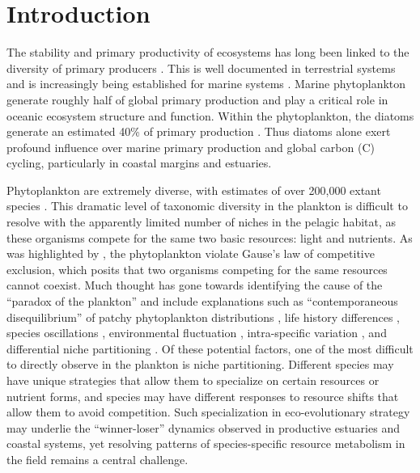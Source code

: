 \section{Introduction}
The stability and primary productivity of ecosystems has long been linked to the diversity of primary producers \citep{Elton1958, Cardinale2012}. This is well documented in terrestrial systems \citep{Naeem1994, Tilman2001, Cadotte2013, Balvanera2006, Tilman1996} and is increasingly being established for marine systems \citep{Behl2011, Striebel2009, Steiner2005, Ptacnik2008}. Marine phytoplankton generate roughly half of global primary production \citep{Nielsen1960, Strickland1965, Field1998} and play a critical role in oceanic ecosystem structure and function. Within the phytoplankton, the diatoms generate an estimated 40\% of primary production \citep{Nelson1995}. Thus diatoms alone exert profound influence over marine primary production and global carbon (C) cycling, particularly in coastal margins and estuaries. \par
Phytoplankton are extremely diverse, with estimates of over 200,000 extant species \citep{Sournia1991, Tett1995, Mann1996}. This dramatic level of taxonomic diversity in the plankton is difficult to resolve with the apparently limited number of niches in the pelagic habitat, as these organisms compete for the same two basic resources: light and nutrients. As was highlighted by \citet{Hutchinson1961}, the phytoplankton violate Gause's law of competitive exclusion, which posits that two organisms competing for the same resources cannot coexist. Much thought has gone towards identifying the cause of the ``paradox of the plankton'' and include explanations such as ``contemporaneous disequilibrium'' of patchy phytoplankton distributions \citep{Richerson1970}, life history differences \citep{Huisman2001}, species oscillations \citep{Huisman1999}, environmental fluctuation \citep{Roy2007}, intra-specific variation \citep{Menden-deuer2014}, and differential niche partitioning \citep{Connel1980}. Of these potential factors, one of the most difficult to directly observe in the plankton is niche partitioning. Different species may have unique strategies that allow them to specialize on certain resources or nutrient forms, and species may have different responses to resource shifts that allow them to avoid competition. Such specialization in eco-evolutionary strategy may underlie the ``winner-loser'' dynamics observed in productive estuaries and coastal systems, yet resolving patterns of species-specific resource metabolism in the field remains a central challenge.\par
